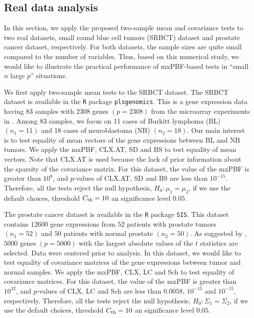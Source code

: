 \documentclass[11pt]{article}
\newcommand{\sg}{\Sigma}
\begin{document}
\subsection{Real data analysis}\label{subsec:real}
In this section, we apply the proposed two-sample mean and covariance tests to two real datasets, small round blue cell tumors (SRBCT) dataset and prostate cancer dataset, respectively.
For both datasets, the sample sizes are quite small compared to the number of variables.
Thus, based on this numerical study, we would like to illustrate the practical performance of mxPBF-based tests in ``small $n$ large $p$'' situations.


We first apply two-sample mean tests to the SRBCT dataset.
The SRBCT dataset is available in the \verb|R| package \verb|plsgenomics|.
This is a gene expression data having 83 samples with 2308 genes $(p=2308)$ from the microarray experiments in \citep{khan2001classification}.
Among 83 samples, we focus on 11 cases of Burkitt lymphoma (BL) $(n_1=11)$ and 18 cases of neuroblastoma (NB) $(n_2=18)$.
Our main interest is to test equality of mean vectors of the gene expressions between BL and NB tumors.
We apply the mxPBF, CLX.AT, SD and BS to test equality of mean vectors.
Note that CLX.AT is used because the lack of prior information about the sparsity of the covariance matrix.
For this dataset, the value of the mxPBF is greater than $10^{8}$, and $p$-values of CLX.AT, SD and BS are less than $10^{-15}$.
Therefore, all the tests reject the null hypothesis, $H_0: \mu_1 =\mu_2$, if we use the default choices, threshold $C_{\rm th} =10$ an significance level $0.05$.





The prostate cancer dataset is available in the \verb|R| package \verb|SIS|.
This dataset contains $12600$ gene expressions from $52$ patients with prostate tumors $(n_1=52)$ and $50$ patients with normal prostate $(n_2=50)$.
As suggested by \cite{cai2013two}, $5000$ genes $(p=5000)$ with the largest absolute values of the $t$ statistics are selected.
Data were centered prior to analysis.
In this dataset, we would like to test equality of covariance matrices of the gene expressions between tumor and normal samples.
We apply the mxPBF, CLX, LC and Sch to test equality of covariance matrices.
For this dataset, the value of the mxPBF is greater than $10^{32}$, and $p$-values of CLX, LC and Sch are less than $0.0058$, $10^{-15}$ and $10^{-15}$, respectively.
Therefore, all the tests reject the null hypothesis, $H_0: \sg_1 =\sg_2$, if we use the default choices, threshold $C_{\rm th} =10$ an significance level $0.05$.
\end{document}
